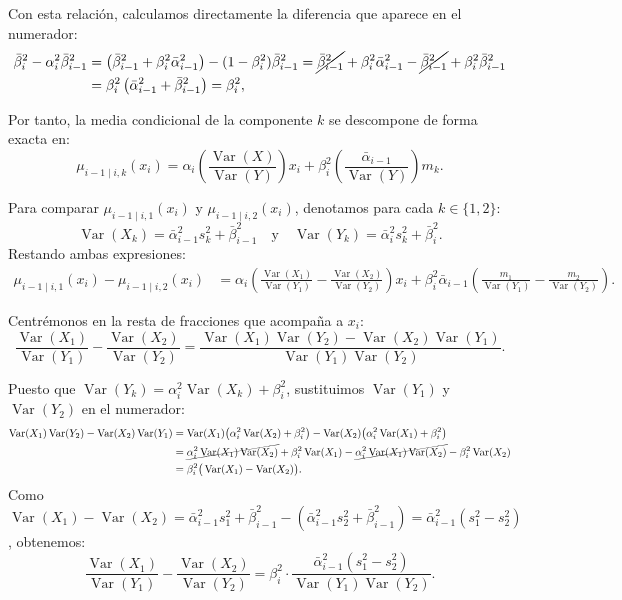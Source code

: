 \documentclass[11pt,a4paper]{article}
\DeclareMathOperator{\Var}{Var}
\begin{document}
Con esta relación, calculamos directamente la diferencia que aparece en el numerador:
\begin{align*}
    \bar{\beta}_i^2 - \alpha_i^2 \bar{\beta}_{i-1}^2 &= \left(\bar{\beta}_{i-1}^2 + \beta_i^2 \bar{\alpha}_{i-1}^2\right) - (1 - \beta_i^2)\bar{\beta}_{i-1}^2
    = \cancel{\bar{\beta}_{i-1}^2} + \beta_i^2 \bar{\alpha}_{i-1}^2 - \cancel{\bar{\beta}_{i-1}^2} + \beta_i^2 \bar{\beta}_{i-1}^2 \\
    &= \beta_i^2 \left(\bar{\alpha}_{i-1}^2 + \bar{\beta}_{i-1}^2\right) 
    = \beta_i^2,
\end{align*}

Por tanto, la media condicional de la componente $k$ se descompone de forma exacta en:
\[
\mu_{i-1\mid i, k}(x_i) = \alpha_i \left(\frac{\Var(X)}{\Var(Y)}\right) x_i + \beta_i^2 \left(\frac{\bar{\alpha}_{i-1}}{\Var(Y)}\right) m_k.
\]

Para comparar $\mu_{i-1\mid i, 1}(x_i)$ y $\mu_{i-1\mid i, 2}(x_i)$, denotamos para cada $k \in \{1, 2\}$:
\[
\Var(X_k) = \bar{\alpha}_{i-1}^2 s_k^2 + \bar{\beta}_{i-1}^2 \quad \text{y} \quad \Var(Y_k) = \bar{\alpha}_i^2 s_k^2 + \bar{\beta}_i^2.
\]
Restando ambas expresiones:
\begin{align*}
    \mu_{i-1\mid i, 1}(x_i) - \mu_{i-1\mid i, 2}(x_i) &= \alpha_i \left( \frac{\Var(X_1)}{\Var(Y_1)} - \frac{\Var(X_2)}{\Var(Y_2)} \right) x_i  + \beta_i^2 \bar{\alpha}_{i-1} \left( \frac{m_1}{\Var(Y_1)} - \frac{m_2}{\Var(Y_2)} \right).
\end{align*}

Centrémonos en la resta de fracciones que acompaña a $x_i$:
\[
\frac{\Var(X_1)}{\Var(Y_1)} - \frac{\Var(X_2)}{\Var(Y_2)} = \frac{\Var(X_1)\Var(Y_2) - \Var(X_2)\Var(Y_1)}{\Var(Y_1)\Var(Y_2)}.
\]

Puesto que $\Var(Y_k) = \alpha_i^2 \Var(X_k) + \beta_i^2$, sustituimos $\Var(Y_1)$ y $\Var(Y_2)$ en el numerador:
\begin{align*}
    \Var(X_1)\Var(Y_2) - \Var(X_2)\Var(Y_1) &= \Var(X_1)\big(\alpha_i^2 \Var(X_2) + \beta_i^2\big) - \Var(X_2)\big(\alpha_i^2 \Var(X_1) + \beta_i^2\big) \\
    &= \cancel{\alpha_i^2 \Var(X_1)\Var(X_2)} + \beta_i^2 \Var(X_1) - \cancel{\alpha_i^2 \Var(X_1)\Var(X_2)} - \beta_i^2 \Var(X_2) \\
    &= \beta_i^2 \big(\Var(X_1) - \Var(X_2)\big).
\end{align*}
Como $\Var(X_1) - \Var(X_2) = \bar{\alpha}_{i-1}^2 s_1^2 + \bar{\beta}_{i-1}^2 - (\bar{\alpha}_{i-1}^2 s_2^2 + \bar{\beta}_{i-1}^2) = \bar{\alpha}_{i-1}^2 (s_1^2 - s_2^2)$, obtenemos:
\[
\frac{\Var(X_1)}{\Var(Y_1)} - \frac{\Var(X_2)}{\Var(Y_2)} = \beta_i^2 \cdot \frac{\bar{\alpha}_{i-1}^2 (s_1^2 - s_2^2)}{\Var(Y_1)\Var(Y_2)}.
\]
\end{document}

